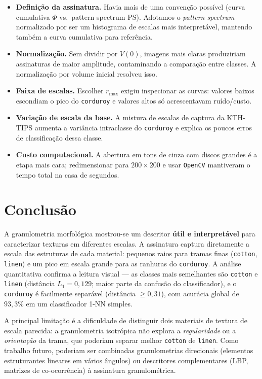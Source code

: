 \documentclass[11pt,a4paper]{article}
\begin{document}
\begin{itemize}
  \item \textbf{Definição da assinatura.} Havia mais de uma convenção possível
        (curva cumulativa $\Phi$ vs.\ pattern spectrum $\mathrm{PS}$). Adotamos o
        \emph{pattern spectrum} normalizado por ser um histograma de escalas mais
        interpretável, mantendo também a curva cumulativa para referência.
  \item \textbf{Normalização.} Sem dividir por $V(0)$, imagens mais claras
        produziriam assinaturas de maior amplitude, contaminando a comparação
        entre classes. A normalização por volume inicial resolveu isso.
  \item \textbf{Faixa de escalas.} Escolher $r_{\max}$ exigiu inspecionar as
        curvas: valores baixos escondiam o pico do \texttt{corduroy} e valores
        altos só acrescentavam ruído/custo.
  \item \textbf{Variação de escala da base.} A mistura de escalas de captura da
        KTH-TIPS aumenta a variância intraclasse do \texttt{corduroy} e explica
        os poucos erros de classificação dessa classe.
  \item \textbf{Custo computacional.} A abertura em tons de cinza com discos
        grandes é a etapa mais cara; redimensionar para $200\times200$ e usar
        \texttt{OpenCV} mantiveram o tempo total na casa de segundos.
\end{itemize}

\section{Conclusão}

A granulometria morfológica mostrou-se um descritor \textbf{útil e
interpretável} para caracterizar texturas em diferentes escalas. A assinatura
captura diretamente a escala das estruturas de cada material: pequenos raios para
tramas finas (\texttt{cotton}, \texttt{linen}) e um pico em escala grande para as
ranhuras do \texttt{corduroy}. A análise quantitativa confirma a leitura visual
--- as classes mais semelhantes são \texttt{cotton} e \texttt{linen}
(distância $L_1 = 0{,}129$; maior parte da confusão do classificador), e o
\texttt{corduroy} é facilmente separável (distância $\ge 0{,}31$), com acurácia
global de $93{,}3\%$ em um classificador 1-NN simples.

A principal limitação é a dificuldade de distinguir dois materiais de textura de
escala parecida: a granulometria isotrópica não explora a \emph{regularidade} ou
a \emph{orientação} da trama, que poderiam separar melhor \texttt{cotton} de
\texttt{linen}. Como trabalho futuro, poderiam ser combinadas granulometrias
direcionais (elementos estruturantes lineares em vários ângulos) ou descritores
complementares (LBP, matrizes de co-ocorrência) à assinatura granulométrica.
\end{document}
